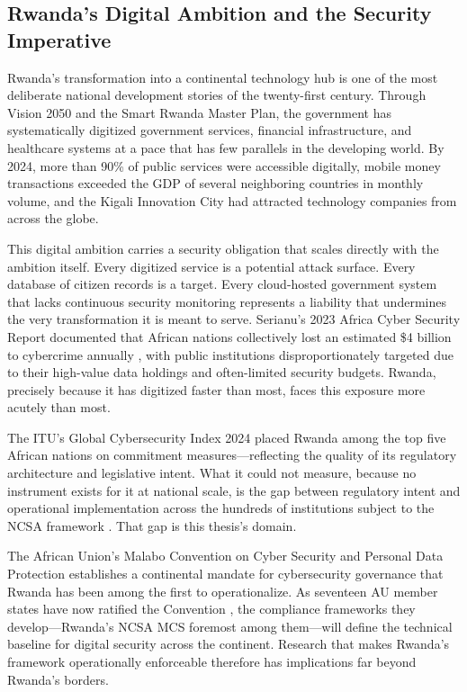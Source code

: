 \documentclass[12pt,oneside]{report}
\begin{document}
\subsection{Rwanda's Digital Ambition and the Security Imperative}

Rwanda's transformation into a continental technology hub is one of the most deliberate national development stories of the twenty-first century. Through Vision 2050 and the Smart Rwanda Master Plan, the government has systematically digitized government services, financial infrastructure, and healthcare systems at a pace that has few parallels in the developing world. By 2024, more than 90\% of public services were accessible digitally, mobile money transactions exceeded the GDP of several neighboring countries in monthly volume, and the Kigali Innovation City had attracted technology companies from across the globe.

This digital ambition carries a security obligation that scales directly with the ambition itself. Every digitized service is a potential attack surface. Every database of citizen records is a target. Every cloud-hosted government system that lacks continuous security monitoring represents a liability that undermines the very transformation it is meant to serve. Serianu's 2023 Africa Cyber Security Report documented that African nations collectively lost an estimated \$4 billion to cybercrime annually \cite{serianu_africa}, with public institutions disproportionately targeted due to their high-value data holdings and often-limited security budgets. Rwanda, precisely because it has digitized faster than most, faces this exposure more acutely than most.

The ITU's Global Cybersecurity Index 2024 \cite{itu_africa_cyber} placed Rwanda among the top five African nations on commitment measures—reflecting the quality of its regulatory architecture and legislative intent. What it could not measure, because no instrument exists for it at national scale, is the gap between regulatory intent and operational implementation across the hundreds of institutions subject to the NCSA framework \cite{ncsa2023}. That gap is this thesis's domain.

The African Union's Malabo Convention on Cyber Security and Personal Data Protection \cite{malabo2014} establishes a continental mandate for cybersecurity governance that Rwanda has been among the first to operationalize. As seventeen AU member states have now ratified the Convention \cite{au_cybersecurity_status}, the compliance frameworks they develop—Rwanda's NCSA MCS foremost among them—will define the technical baseline for digital security across the continent. Research that makes Rwanda's framework operationally enforceable therefore has implications far beyond Rwanda's borders.
\end{document}
